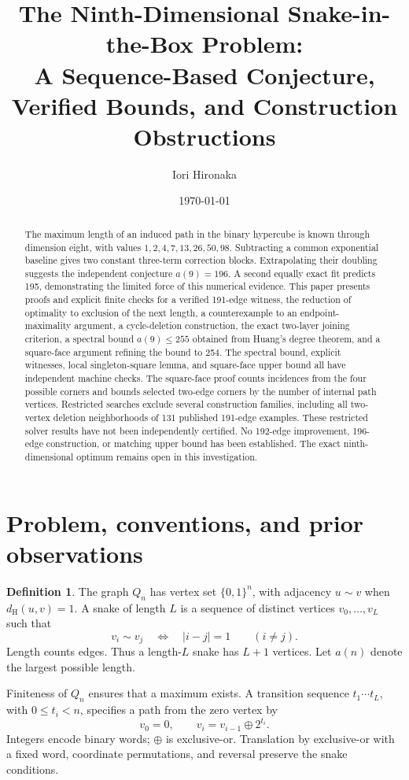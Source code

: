 \documentclass[11pt,a4paper]{article}
\title{The Ninth-Dimensional Snake-in-the-Box Problem:\\
A Sequence-Based Conjecture, Verified Bounds, and Construction Obstructions}
\author{Iori Hironaka}
\date{\today}
\theoremstyle{definition}
\newtheorem{definition}[theorem]{Definition}
\theoremstyle{remark}
\newcommand{\Q}{Q}
\newcommand{\Ham}{d_{\mathrm H}}
\begin{document}
\maketitle
\begin{abstract}
The maximum length of an induced path in the binary hypercube is known through dimension eight, with values $1,2,4,7,13,26,50,98$. Subtracting a common exponential baseline gives two constant three-term correction blocks. Extrapolating their doubling suggests the independent conjecture $a(9)=196$. A second equally exact fit predicts 195, demonstrating the limited force of this numerical evidence. This paper presents proofs and explicit finite checks for a verified 191-edge witness, the reduction of optimality to exclusion of the next length, a counterexample to an endpoint-maximality argument, a cycle-deletion construction, the exact two-layer joining criterion, a spectral bound $a(9)\le255$ obtained from Huang's degree theorem, and a square-face argument refining the bound to 254. The spectral bound, explicit witnesses, local singleton-square lemma, and square-face upper bound all have independent machine checks. The square-face proof counts incidences from the four possible corners and bounds selected two-edge corners by the number of internal path vertices. Restricted searches exclude several construction families, including all two-vertex deletion neighborhoods of 131 published 191-edge examples. These restricted solver results have not been independently certified. No 192-edge improvement, 196-edge construction, or matching upper bound has been established. The exact ninth-dimensional optimum remains open in this investigation.
\end{abstract}
\setcounter{tocdepth}{1}
\tableofcontents
\clearpage

\section{Problem, conventions, and prior observations}
\begin{definition}
The graph $\Q_n$ has vertex set $\{0,1\}^n$, with adjacency $u\sim v$ when $\Ham(u,v)=1$. A snake of length $L$ is a sequence of distinct vertices $v_0,\ldots,v_L$ such that
\[
v_i\sim v_j\quad\Longleftrightarrow\quad |i-j|=1\qquad(i\ne j).
\]
Length counts edges. Thus a length-$L$ snake has $L+1$ vertices. Let $a(n)$ denote the largest possible length.
\end{definition}
Finiteness of $\Q_n$ ensures that a maximum exists. A transition sequence $t_1\cdots t_L$, with $0\le t_i<n$, specifies a path from the zero vertex by
\[
v_0=0,\qquad v_i=v_{i-1}\mathbin{\oplus}2^{t_i}.
\]
Integers encode binary words; $\oplus$ is exclusive-or. Translation by exclusive-or with a fixed word, coordinate permutations, and reversal preserve the snake conditions.
\end{document}
